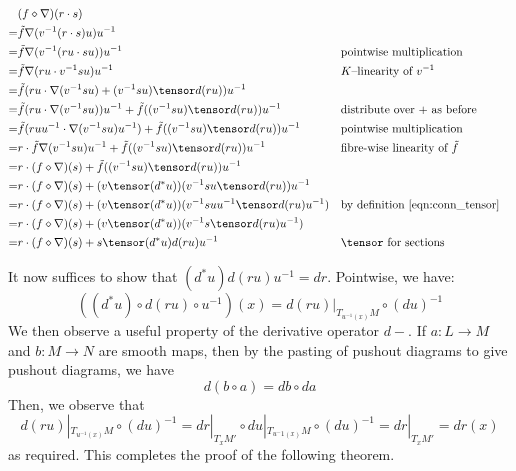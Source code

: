 \documentclass[\PRJWD/Thick_TQFTs_and_Quantum_Information.tex]{subfiles}
\begin{document}
\begin{align*}
   & (f \diamond \nabla)(r \cdot s) \\
  =& \tilde{f}\nabla(v^{-1}(r \cdot s)u)u^{-1} \\
  =& \tilde{f}\nabla(v^{-1}(ru \cdot su))u^{-1}
    && \text{pointwise multiplication} \\
  =& \tilde{f}\nabla(ru \cdot v^{-1}su)u^{-1}
    && \text{$K$--linearity of } v^{-1} \\
  =& \tilde{f}(ru \cdot \nabla(v^{-1}su) + (v^{-1}su) \tensor d(ru))u^{-1} \\
  =& \tilde{f}(ru \cdot \nabla(v^{-1}su))u^{-1}
      + \tilde{f}((v^{-1}su) \tensor d(ru))u^{-1}
    && \text{distribute over $+$ as before} \\
  =& \tilde{f}(ruu^{-1} \cdot \nabla(v^{-1}su)u^{-1})
      + \tilde{f}((v^{-1}su) \tensor d(ru))u^{-1}
    && \text{pointwise multiplication} \\
  =& r \cdot \tilde{f}\nabla(v^{-1}su)u^{-1}
      + \tilde{f}((v^{-1}su) \tensor d(ru))u^{-1}
    && \text{fibre-wise linearity of } \tilde{f} \\
  =& r \cdot (f \diamond \nabla)(s)
      + \tilde{f}((v^{-1}su) \tensor d(ru))u^{-1} \\
  =& r \cdot (f \diamond \nabla)(s)
      + (v \tensor (d^*u))(v^{-1}su \tensor d(ru))u^{-1} \\
  =& r \cdot (f \diamond \nabla)(s)
      + (v \tensor (d^*u))(v^{-1}suu^{-1} \tensor d(ru)u^{-1})
    && \text{by definition \eqref{eqn:conn_tensor}} \\
  =& r \cdot (f \diamond \nabla)(s)
      + (v \tensor (d^*u))(v^{-1}s \tensor d(ru)u^{-1}) \\
  =& r \cdot (f \diamond \nabla)(s)
      + s \tensor (d^*u)d(ru)u^{-1}
    && \text{$\tensor$ for sections}
\end{align*}

It now suffices to show that $(d^*u)d(ru)u^{-1} = dr$. Pointwise, we have:
\[
  ((d^*u) \circ d(ru) \circ u^{-1})(x) = d(ru)|_{T_{u^{-1}(x)}M} \circ (du)^{-1}
\]
We then observe a useful property of the derivative
operator $d-$. If $a : L \to M$ and $b : M \to N$ are smooth maps, then by the
pasting of pushout diagrams to give pushout diagrams, we have
\[
  d(b \circ a) = db \circ da
\]
Then, we observe that
\[
  d(ru)|_{T_{u^{-1}(x)}M} \circ (du)^{-1}
  = dr|_{T_xM'} \circ du|_{T_{u^-1(x)}M} \circ (du)^{-1}
  = dr|_{T_xM'}
  = dr(x)
\]
as required. This completes the proof of the following theorem.
\end{document}
